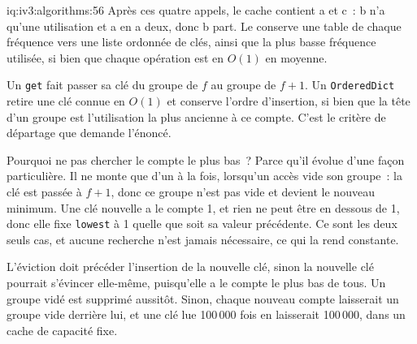 \begin{solution}{iq:iv3:algorithms:56}
Après ces quatre appels, le cache contient a et c~: b n'a qu'une utilisation et a en a deux, donc b part. Le  conserve une table de chaque fréquence vers une liste ordonnée de clés, ainsi que la plus basse fréquence utilisée, si bien que chaque opération est en $O(1)$ en moyenne.
\label{lst:iv3:al:lfu}

Un \texttt{get} fait passer sa clé du groupe de $f$ au groupe de $f + 1$. Un \texttt{OrderedDict} retire une clé connue en $O(1)$ et conserve l'ordre d'insertion, si bien que la tête d'un groupe est l'utilisation la plus ancienne à ce compte. C'est le critère de départage que demande l'énoncé.

Pourquoi ne pas chercher le compte le plus bas~? Parce qu'il évolue d'une façon particulière. Il ne monte que d'un à la fois, lorsqu'un accès vide son groupe~: la clé est passée à $f + 1$, donc ce groupe n'est pas vide et devient le nouveau minimum. Une clé nouvelle a le compte 1, et rien ne peut être en dessous de 1, donc elle fixe \texttt{lowest} à 1 quelle que soit sa valeur précédente. Ce sont les deux seuls cas, et aucune recherche n'est jamais nécessaire, ce qui la rend constante.

L'éviction doit précéder l'insertion de la nouvelle clé, sinon la nouvelle clé pourrait s'évincer elle-même, puisqu'elle a le compte le plus bas de tous. Un groupe vidé est supprimé aussitôt. Sinon, chaque nouveau compte laisserait un groupe vide derrière lui, et une clé lue 100\,000 fois en laisserait 100\,000, dans un cache de capacité fixe.

\end{solution}

